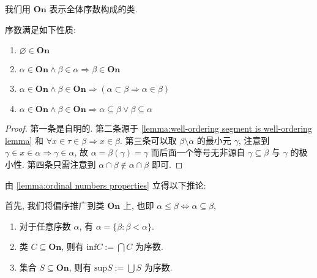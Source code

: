 我们用 \(\mathbf{On}\) 表示全体序数构成的类.

\begin{lemma}
    \label{lemma:ordinal numbers properties}
    序数满足如下性质:

    \begin{enumerate}
        \item \(\varnothing \in \mathbf{On}\) 
        \item \(\alpha \in \mathbf{On} \land \beta \in \alpha \Rightarrow \beta \in \mathbf{On}\)
        \item \(\alpha \in \mathbf{On} \land \beta \in \mathbf{On} \Rightarrow (\alpha \subset \beta \Rightarrow \alpha \in \beta)\)
        \item \(\alpha \in \mathbf{On} \land \beta \in \mathbf{On} \Rightarrow \alpha \subseteq \beta \lor \beta \subseteq \alpha\)
    \end{enumerate}

    \begin{proof}
        第一条是自明的. 第二条源于 \ref{lemma:well-ordering segment is well-ordering lemma} 和
        \(\forall x \in \tau \in \beta \Rightarrow x \in \beta\). 第三条可以取 \(\beta \setminus \alpha\) 的最小元 \(\gamma\),
        注意到 \(\gamma \in x \in \alpha \Rightarrow \gamma \in \alpha\), 故 \(\alpha = \beta(\gamma) = \gamma\) 而后面一个等号无非源自 \(\gamma \subseteq \beta\) 与 \(\gamma\) 的极小性.
        第四条只需注意到 \(\alpha \cap \beta \notin \alpha \cap \beta\) 即可.
    \end{proof}
\end{lemma}

由 \ref{lemma:ordinal numbers properties} 立得以下推论:

\begin{corollary}
    \label{corollary:ordinal numbers properties}
    首先, 我们将偏序推广到类 \(\mathbf{On}\) 上, 也即 \(\alpha \le \beta \Leftrightarrow \alpha \subseteq \beta\),

    \begin{enumerate}
        \item 对于任意序数 \(\alpha\), 有 \(\alpha = \{\beta : \beta < \alpha\}\).
        \item 类 \(C \subseteq \mathbf{On}\), 则有 \(\mathrm{inf} C := \bigcap C\) 为序数.
        \item 集合 \(S \subseteq \mathbf{On}\), 则有 \(\mathrm{sup} S := \bigcup S\) 为序数.
    \end{enumerate}
\end{corollary}

